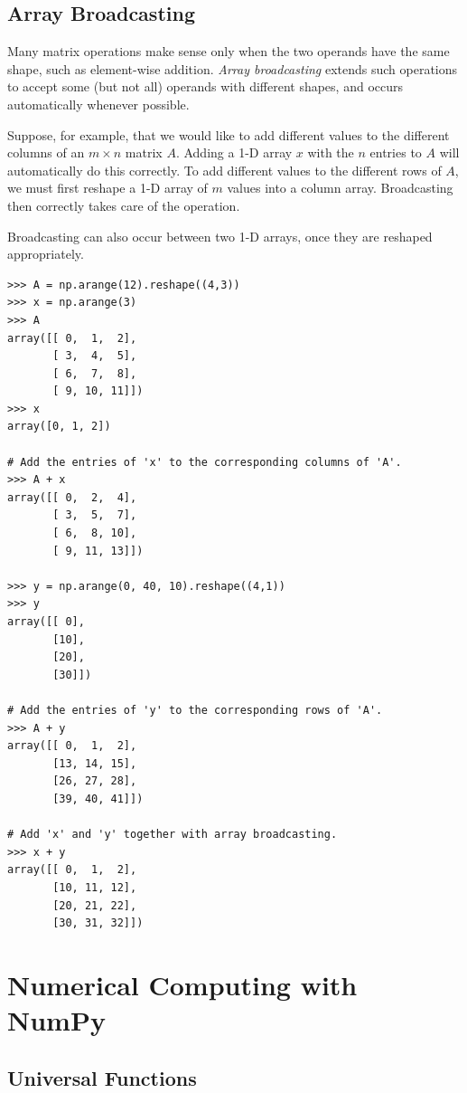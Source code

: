 \subsection*{Array Broadcasting} %

Many matrix operations make sense only when the two operands have the same shape, such as element-wise addition.
\emph{Array broadcasting} extends such operations to accept some (but not all) operands with different shapes, and occurs automatically whenever possible.

Suppose, for example, that we would like to add different values to the different columns of an $m\times n$ matrix $A$.
Adding a 1-D array $x$ with the $n$ entries to $A$ will automatically do this correctly.
To add different values to the different rows of $A$, we must first reshape a 1-D array of $m$ values into a column array.
Broadcasting then correctly takes care of the operation.

Broadcasting can also occur between two 1-D arrays, once they are reshaped appropriately.

\begin{lstlisting}
>>> A = np.arange(12).reshape((4,3))
>>> x = np.arange(3)
>>> A
array([[ 0,  1,  2],
       [ 3,  4,  5],
       [ 6,  7,  8],
       [ 9, 10, 11]])
>>> x
array([0, 1, 2])

# Add the entries of 'x' to the corresponding columns of 'A'.
>>> A + x
array([[ 0,  2,  4],
       [ 3,  5,  7],
       [ 6,  8, 10],
       [ 9, 11, 13]])

>>> y = np.arange(0, 40, 10).reshape((4,1))
>>> y
array([[ 0],
       [10],
       [20],
       [30]])

# Add the entries of 'y' to the corresponding rows of 'A'.
>>> A + y
array([[ 0,  1,  2],
       [13, 14, 15],
       [26, 27, 28],
       [39, 40, 41]])

# Add 'x' and 'y' together with array broadcasting.
>>> x + y
array([[ 0,  1,  2],
       [10, 11, 12],
       [20, 21, 22],
       [30, 31, 32]])
\end{lstlisting}

\section*{Numerical Computing with NumPy} %

\subsection*{Universal Functions} %

